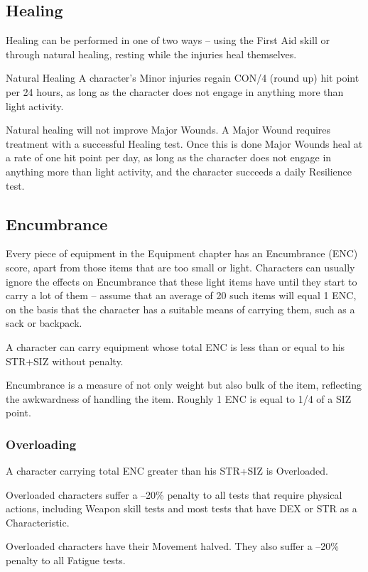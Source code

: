 \subsection{Healing}
Healing can be performed in one of two ways – using the First Aid skill or through natural healing, resting while the injuries heal themselves. 

Natural Healing 
A character’s Minor injuries regain CON/4 (round up) hit point per 24 hours, as long as the character does not engage in anything more than light activity. 

Natural healing will not improve Major Wounds. A Major Wound requires treatment with a successful Healing test. Once this is done Major Wounds heal at a rate of one hit point per day, as long as the character does not engage in anything more than light activity, and the character succeeds a daily Resilience test. 

\subsection{Encumbrance}
Every piece of equipment in the Equipment chapter has an Encumbrance (ENC) score, apart from those items that are too small or light. Characters can usually ignore the effects on Encumbrance that these light items have until they start to carry a lot of them – assume that an average of 20 such items will equal 1 ENC, on the basis that the character has a suitable means of carrying them, such as a sack or backpack. 

A character can carry equipment whose total ENC is less than or equal to his STR+SIZ without penalty. 

Encumbrance is a measure of not only weight but also bulk of the item, reflecting the awkwardness of handling the item. Roughly 1 ENC is equal to 1/4 of a SIZ point.

\subsubsection{Overloading}
A character carrying total ENC greater than his STR+SIZ is Overloaded. 
\begin{rpg-list}
\item Overloaded characters suffer a –20\% penalty to all tests that require physical actions, including Weapon skill tests and most tests that have DEX or STR as a Characteristic. 

\item Overloaded characters have their Movement halved. They also suffer a –20\% penalty to all Fatigue tests. 
\end{rpg-list}

